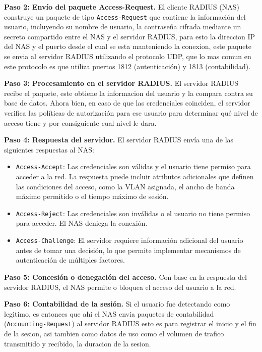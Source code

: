 \documentclass[letterpaper,12pt]{article}
\begin{document}
\textbf{Paso 2: Env\'io del paquete Access-Request.} El cliente RADIUS (NAS) construye un paquete de tipo 
\texttt{Access-Request} que contiene la informaci\'on del usuario, 
incluyendo su nombre de usuario, la contraseña cifrada mediante un secreto compartido entre el NAS y 
el servidor RADIUS, para esto la direccion IP del NAS y el puerto desde el cual se esta manteniendo la conexion,
este paquete se envia al servidor RADIUS utilizando el protocolo UDP, 
que lo mas comun en este protocolo es que utiliza puertos 1812 (autenticaci\'on) y 1813 (contabilidad).

\textbf{Paso 3: Procesamiento en el servidor RADIUS.} El servidor RADIUS recibe el paquete, 
este obtiene la informacion del usuario y la compara contra su base de datos. 
Ahora bien, en caso de que las credenciales coinciden, el servidor verifica 
las pol\'iticas de autorizaci\'on para ese usuario para determinar qu\'e nivel de acceso tiene y por consiguiente 
cual nivel le dara.

\textbf{Paso 4: Respuesta del servidor.} El servidor RADIUS env\'ia una de las siguientes respuestas al NAS:

\begin{itemize}[leftmargin=2cm]
  \item \texttt{Access-Accept}: Las credenciales son v\'alidas y el usuario tiene permiso para acceder a la red. La respuesta puede incluir atributos adicionales que definen las condiciones del acceso, como la VLAN asignada, el ancho de banda m\'aximo permitido o el tiempo m\'aximo de sesi\'on.
  \item \texttt{Access-Reject}: Las credenciales son inv\'alidas o el usuario no tiene permiso para acceder. El NAS deniega la conexi\'on.
  \item \texttt{Access-Challenge}: El servidor requiere informaci\'on adicional del usuario antes de tomar una decisi\'on, lo que permite implementar mecanismos de autenticaci\'on de m\'ultiples factores.
\end{itemize}

\textbf{Paso 5: Concesi\'on o denegaci\'on del acceso.} Con base en la respuesta del servidor RADIUS, 
el NAS permite o bloquea el acceso del usuario a la red.

\textbf{Paso 6: Contabilidad de la sesi\'on.} Si el usuario fue detectando como legitimo, es entonces que ahi el 
NAS envia paquetes de contabilidad (\texttt{Accounting-Request}) 
al servidor RADIUS esto es para registrar el inicio y el fin de la sesion, asi tambien como datos de uso como el 
volumen de trafico transmitido y recibido, la duracion de la sesion.
\end{document}
